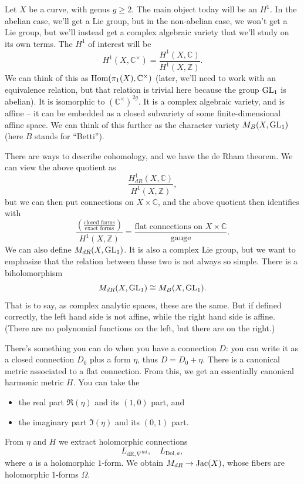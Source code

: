 \documentclass[reqno]{amsart} 
\begin{document}
Let $X$ be a curve, with genus $g \geq 2$.  The main object today will be an $H^1$.  In the abelian case, we'll get a Lie group, but in the non-abelian case, we won't get a Lie group, but we'll instead get a complex algebraic variety that we'll study on its own terms.  The $H^1$ of interest will be
\begin{equation*}
  H^1(X, \mathbb{C}^\times) =
  \frac{H^1(X, \mathbb{C})}{H^1(X, \mathbb{Z})}.
\end{equation*}
We can think of this as $\operatorname{Hom}(\pi_1(X), \mathbb{C}^\times)$ (later, we'll need to work with an equivalence relation, but that relation is trivial here because the group $\operatorname{GL}_1$ is abelian).  It is isomorphic to $(\mathbb{C}^\times)^{2 g}$.  It is a complex algebraic variety, and is affine -- it can be embedded as a closed subvariety of some finite-dimensional affine space.  We can think of this further as the character variety $M_B(X, \operatorname{GL} _1)$ (here $B$ stands for ``Betti'').

There are ways to describe cohomology, and we have the de Rham theorem.  We can view the above quotient as
\begin{equation*}
  \frac{H^1_{d R}(X, \mathbb{C})}{H^1(X, \mathbb{Z})},
\end{equation*}
but we can then put connections on $X \times \mathbb{C}$, and the above quotient then identifies with
\begin{equation*}
  \frac{  \left( \frac{\text{closed forms}}{\text{exact forms}} \right)}{
    H^1(X, \mathbb{Z})
  }
  =
  \frac{\text{flat connections on $X \times \mathbb{C}$}}{\text{gauge}}.
\end{equation*}
We can also define $M_{d R}(X, \operatorname{GL}_1)$.  It is also a complex Lie group, but we want to emphasize that the relation between these two is not always so simple.  There is a biholomorphism
\begin{equation*}
  M_{d R}(X, \operatorname{GL}_1) \cong M_B(X, \operatorname{GL}_1).
\end{equation*}
That is to say, as complex analytic spaces, these are the same.  But if defined correctly, the left hand side is not affine, while the right hand side is affine.  (There are no polynomial functions on the left, but there are on the right.)

There's something you can do when you have a connection $D$: you can write it as a closed connection $D_0$ plus a form $\eta$, thus $D = D_0 + \eta$.  There is a canonical metric associated to a flat connection.  From this, we get an essentially canonical harmonic metric $H$.  You can take the
\begin{itemize}
\item the real part $\Re(\eta)$ and its $(1,0)$ part, and
\item the imaginary part $\Im(\eta)$ and its $(0,1)$ part.
\end{itemize}
From $\eta$ and $H$ we extract holomorphic connections
\begin{equation*}
  L_{\mathrm{dR}, \nabla^{\mathrm{hol}}}, \quad
  L_{\mathrm{Dol}, a},
\end{equation*}
where $a$ is a holomorphic $1$-form.  We obtain $M_{d R} \rightarrow \operatorname{Jac}(X)$, whose fibers are holomorphic $1$-forms $\Omega$.
\end{document}
